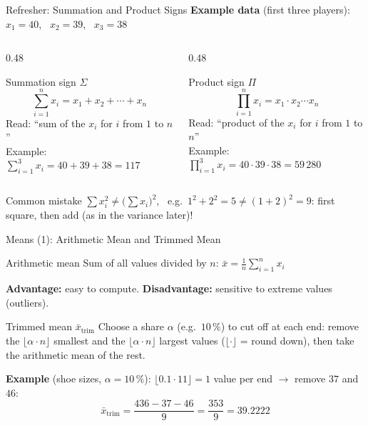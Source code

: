 \documentclass[aspectratio=169,11pt]{beamer}
\begin{document}
\begin{frame}{Refresher: Summation and Product Signs}
  \textbf{Example data} (first three players): \ $x_1 = 40$, \ $x_2 = 39$, \ $x_3 = 38$
  \begin{columns}[T]
    \begin{column}{0.48\textwidth}
      \begin{block}{Summation sign $\Sigma$}
        \[ \sum_{i=1}^{n} x_i = x_1 + x_2 + \cdots + x_n \]
        Read: ``sum of the $x_i$ for $i$ from $1$ to $n$''\\[3pt]
        Example: $\sum_{i=1}^{3} x_i = 40 + 39 + 38 = 117$
      \end{block}
    \end{column}
    \begin{column}{0.48\textwidth}
      \begin{block}{Product sign $\Pi$}
        \[ \prod_{i=1}^{n} x_i = x_1 \cdot x_2 \cdots x_n \]
        Read: ``product of the $x_i$ for $i$ from $1$ to $n$''\\[3pt]
        Example: $\prod_{i=1}^{3} x_i = 40 \cdot 39 \cdot 38 = 59\,280$
      \end{block}
    \end{column}
  \end{columns}
  \vspace{0.2cm}
  \begin{alertblock}{Common mistake}
    $\sum x_i^2 \neq \bigl(\sum x_i\bigr)^2$, \ e.g.\ $1^2 + 2^2 = 5 \neq (1+2)^2 = 9$:
    first square, then add (as in the variance later)!
  \end{alertblock}
\end{frame}

\begin{frame}{Means (1): Arithmetic Mean and Trimmed Mean}
  \begin{block}{Arithmetic mean}
    Sum of all values divided by $n$:
    \quad $\displaystyle \bar{x} = \frac{1}{n}\sum_{i=1}^{n} x_i$
  \end{block}

  \smallskip
  \textbf{Advantage:} easy to compute. \quad \textbf{Disadvantage:} sensitive to extreme values (outliers).
  \begin{block}{Trimmed mean $\bar{x}_{\text{trim}}$}
    Choose a share $\alpha$ (e.g.\ $10\,\%$) to cut off at each end: remove the $\lfloor \alpha \cdot n \rfloor$
    smallest and the $\lfloor \alpha \cdot n \rfloor$ largest values ($\lfloor\cdot\rfloor$ = round down),
    then take the arithmetic mean of the rest.
  \end{block}
  \textbf{Example} (shoe sizes, $\alpha = 10\,\%$): $\lfloor 0.1 \cdot 11 \rfloor = 1$ value per end
  $\to$ remove $37$ and $46$:
  \[ \bar{x}_{\text{trim}} = \frac{436 - 37 - 46}{9} = \frac{353}{9} = 39.2222 \]
\end{frame}
\end{document}
